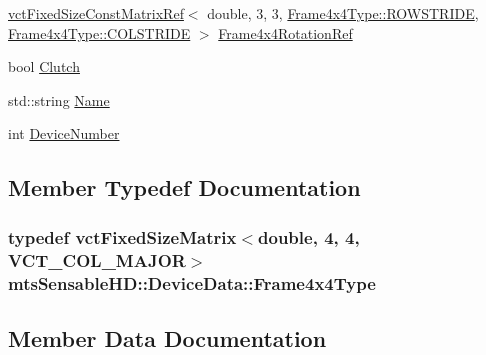\begin{DoxyCompactItemize}
\item 
\hyperlink{classvct_fixed_size_const_matrix_ref}{vct\+Fixed\+Size\+Const\+Matrix\+Ref}$<$ double, 3, 3, \hyperlink{classvct_fixed_size_matrix_base_a7ca4cc289d4bd697476f2d37e82e9a38a6c561939f5de9c5e815b889df7662117}{Frame4x4\+Type\+::\+R\+O\+W\+S\+T\+R\+I\+D\+E}, \hyperlink{classvct_fixed_size_matrix_base_a7ca4cc289d4bd697476f2d37e82e9a38a920a67cbcd917bab0e46677bf43cb6b8}{Frame4x4\+Type\+::\+C\+O\+L\+S\+T\+R\+I\+D\+E} $>$ \hyperlink{structmts_sensable_h_d_1_1_device_data_a3d47fe8f2f161326ac01587b7ac74d2c}{Frame4x4\+Rotation\+Ref}
\item 
bool \hyperlink{structmts_sensable_h_d_1_1_device_data_a9f16b01377b10aa6b9961fd55dac7cd7}{Clutch}
\item 
std\+::string \hyperlink{structmts_sensable_h_d_1_1_device_data_aa1b15a9026612af14c0b37cca2deb4f2}{Name}
\item 
int \hyperlink{structmts_sensable_h_d_1_1_device_data_adb16cabaccc5633c5a4676f6372e3211}{Device\+Number}
\end{DoxyCompactItemize}


\subsection{Member Typedef Documentation}
\hypertarget{structmts_sensable_h_d_1_1_device_data_a46ac85be135ad15c04fbe2b06a689781}{}
\subsubsection[{Frame4x4\+Type}]{\setlength{\rightskip}{0pt plus 5cm}typedef {\bf vct\+Fixed\+Size\+Matrix}$<$double, 4, 4, {\bf V\+C\+T\+\_\+\+C\+O\+L\+\_\+\+M\+A\+J\+O\+R}$>$ {\bf mts\+Sensable\+H\+D\+::\+Device\+Data\+::\+Frame4x4\+Type}}\label{structmts_sensable_h_d_1_1_device_data_a46ac85be135ad15c04fbe2b06a689781}


\subsection{Member Data Documentation}
\hypertarget{structmts_sensable_h_d_1_1_device_data_a9d5eb167f38e79ef41f510177b19a292}{}

